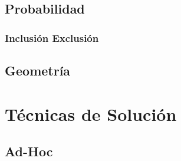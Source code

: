 \documentclass[12pt, fleqn]{report}                             %
\theoremstyle{break}                                            %
\begin{document}
    \clearpage
    \chapter{Probabilidad}

        \section{Inclusión Exclusión}

  
    \clearpage
    \chapter{Geometría}


\part{Técnicas de Solución}

    \clearpage
    \chapter{Ad-Hoc}

    
    \clearpage
\end{document}

